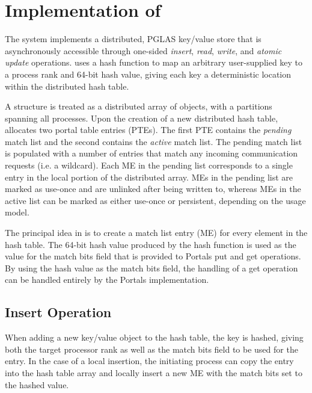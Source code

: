 \section{Implementation of \pdht}


The \pdht system implements a distributed, PGLAS key/value store that is
asynchronously accessible through one-sided {\em insert}, {\em read}, {\em
write}, and {\em atomic update}
operations.  \pdht uses a hash function to map an arbitrary
user-supplied key to a process rank and 64-bit hash value, giving each key a
deterministic location within the distributed hash table.

A \pdht structure is treated as a distributed array of objects, with a
partitions spanning all processes. Upon the creation of a new
distributed hash table, \pdht allocates two portal table
entries (PTEs). The first PTE contains the {\em pending} match list and the
second contains the {\em active} match list. The pending match list is
populated with a number of entries that match any incoming
communication requests (i.e. a wildcard). Each ME in the pending list
corresponds to a single entry in the local portion of the distributed
array. MEs in the pending list are marked as use-once and are unlinked
after being written to, whereas MEs in the active list can be marked as either
use-once or persistent, depending on the usage model.

The principal idea in \pdht is to create a match list entry (ME) for
every element in the hash table. The 64-bit hash value produced by the
hash function is used as the value for the match bits field that is provided
to Portals put and get operations. By using the hash value as
the match bits field, the handling of a get operation can be
handled entirely by the Portals implementation.


\subsection{Insert Operation}

When adding a new key/value object to the hash table, the key is
hashed, giving both the target processor rank as well as the match
bits field to be used for the entry. In the case of a local insertion,
the initiating process can copy the entry into the hash table array and
locally insert a new ME with the match bits set to the hashed value. 

